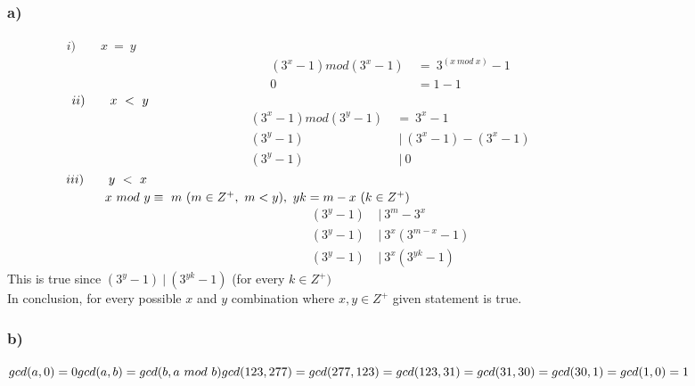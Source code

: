 \documentclass[12pt]{article}
\begin{document}
\subsubsection*{a)}
$\hspace{2cm}i) \qquad x\ =\ y$ 
\begin{equation} 
\begin{split}
(3^x-1)mod(3^x-1)\ & = \ 3^{(x\ mod\ x)}-1 \\
0 & = 1-1
\end{split}
\end{equation}
$\hspace{1.8cm}ii) \qquad x\ <\ y$ 
\begin{equation} 
\begin{split}
(3^x-1)mod(3^y-1)\ & = \ 3^x-1 \\
(3^y-1) &\ |\ (3^x-1)-(3^x-1) \\
(3^y-1) &\ |\ 0
\end{split}
\end{equation}
$\hspace{1.65cm}iii) \qquad y\ <\ x$ \\
\vspace{0.1cm}
$\hspace{1.8cm}\ \ \qquad x\ mod\ y \equiv \ m\ (m \in Z^+,\ m<y),\ yk=m-x\ (k \in Z^+)$ 
\begin{equation} 
\begin{split}
(3^y-1)\ & |\ 3^m-3^x \\
(3^y-1)\ & |\ 3^x(3^{m-x}-1) \\
(3^y-1)\ & |\ 3^x(3^{yk}-1) 
\end{split}
\end{equation}
\hspace{2.8cm}
This is true since $(3^y-1)\ |\ (3^{yk}-1)$ \quad (for every $k \in Z^+)$ \vspace{0.5cm}\\
In conclusion, for every possible $x$ and $y$ combination where $x,y\in Z^+$ given statement is true.





\subsubsection*{b)}
$
gcd(a,0)=0 \\
gcd(a,b)=gcd(b,a\ mod\ b) \\
gcd(123,277)=
gcd(277,123)=
gcd(123,31)=
gcd(31,30)=
gcd(30,1)=
gcd(1,0)=1$
\end{document}
